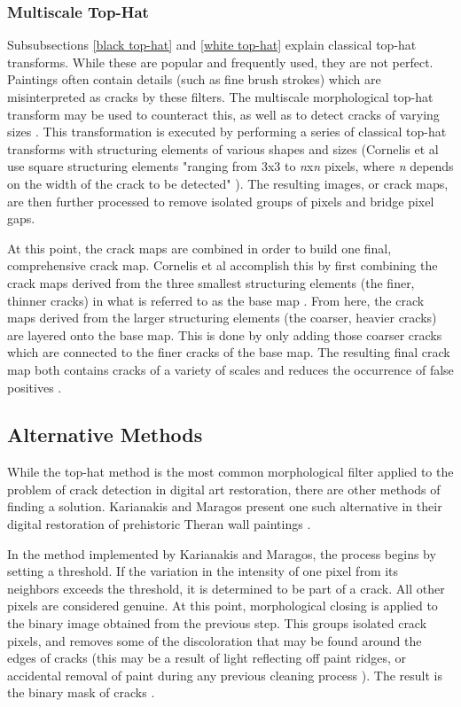 \documentclass{sig-alternate}
\begin{document}
\subsubsection{Multiscale Top-Hat}\label{multiscale top-hat}
Subsubsections \ref{black top-hat} and \ref{white top-hat} explain classical top-hat transforms. While these are popular and frequently used, they are not perfect. Paintings often contain details (such as fine brush strokes) which are misinterpreted as cracks by these filters. The multiscale morphological top-hat transform may be used to counteract this, as well as to detect cracks of varying sizes \cite{Altarpiece:2013}. This transformation is executed by performing a series of classical top-hat transforms with structuring elements of various shapes and sizes (Cornelis et al use square structuring elements "ranging from 3x3 to \textit{n}x\textit{n} pixels, where \textit{n} depends on the width of the crack to be detected" \cite{Altarpiece:2013}). The resulting images, or crack maps, are then further processed to remove isolated groups of pixels and bridge pixel gaps.

At this point, the crack maps are combined in order to build one final, comprehensive crack map. Cornelis et al accomplish this by first combining the crack maps derived from the three smallest structuring elements (the finer, thinner cracks) in what is referred to as the base map \cite{Altarpiece:2013}. From here, the crack maps derived from the larger structuring elements (the coarser, heavier cracks) are layered onto the base map. This is done by only adding those coarser cracks which are connected to the finer cracks of the base map. The resulting final crack map both contains cracks of a variety of scales and reduces the occurrence of false positives \cite{Altarpiece:2013}.

\subsection{Alternative Methods}\label{alternative}
While the top-hat method is the most common morphological filter applied to the problem of crack detection in digital art restoration, there are other methods of finding a solution. Karianakis and Maragos present one such alternative in their digital restoration of prehistoric Theran wall paintings \cite{Theran:2013}.

In the method implemented by Karianakis and Maragos, the process begins by setting a threshold. If the variation in the intensity of one pixel from its neighbors exceeds the threshold, it is determined to be part of a crack. All other pixels are considered genuine. At this point, morphological closing is applied to the binary image obtained from the previous step. This groups isolated crack pixels, and removes some of the discoloration that may be found around the edges of cracks (this may be a result of light reflecting off paint ridges, or accidental removal of paint during any previous cleaning process \cite{Altarpiece:2013}). The result is the binary mask of cracks \cite{Theran:2013}.
\end{document}
